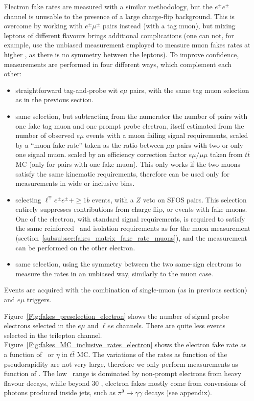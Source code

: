 Electron fake rates are measured with a similar methodology, but the $e^\pm e^\pm$ channel is unusable to the presence of a large charge-flip background. 
This is overcome by working with $e^\pm\mu^\pm$ pairs instead (with a tag muon), but mixing leptons of different flavours brings additional complications 
(one can not, for example, use the unbiased measurement employed to measure muon fakes rates at higher \pt, as there is no symmetry between the leptons). 
To improve confidence, measurements are performed in four different ways, which complement each other: 
\begin{itemize}
\item straightforward tag-and-probe wit $e\mu$ pairs, with the same tag muon selection as in the previous section. 
\item same selection, but subtracting from the numerator the number of pairs with one fake tag muon and one prompt probe electron, 
itself estimated from the number of observed $e\mu$ events with a muon failing signal requirements, 
scaled by a ``muon fake rate'' taken as the ratio between $\mu\mu$ pairs with two or only one signal muon. 
scaled by an efficiency correction factor $e\mu/\mu\mu$ taken from $t\bar t$ MC (only for pairs with one fake muon). 
This only works if the two muons satisfy the same kinematic requirements, therefore can be used only for measurements in wide or inclusive bins. 
\item selecting $\ell^\mp e^\pm e^\pm+\ge 1b$ events, with a $Z$ veto on SFOS pairs. 
This selection entirely suppresses contributions from charge-flip, or events with fake muons. 
One of the electron, with standard signal requirements, is required to satisfy the same reinforced \pt\ and isolation requirements as for the muon measurement 
(section~\ref{subsubsec:fakes_matrix_fake_rate_muons}), 
and the measurement can be performed on the other electron. 
\item same selection, using the symmetry between the two same-sign electrons to measure the rates in an unbiased way, similarly to the muon case. 
\end{itemize}
Events are acquired with the combination of single-muon (as in previous section) and $e\mu$ triggers. 


Figure~\ref{Fig:fakes_preselection_electron} shows the number of signal probe electrons selected in the $e\mu$ and $\ell ee$ channels. 
There are quite less events selected in the trilepton channel. 
Figure~\ref{Fig:fakes_MC_inclusive_rates_electron} shows the electron fake rate as a function of \pt\ or $\eta$ in $t\bar t$ MC. 
The variations of the rates as function of the pseudorapidity are not very large, 
therefore we only perform measurements as function of \pt. 
The low \pt\ range is dominated by non-prompt electrons from heavy flavour decays, while beyond 30 \GeV, 
electron fakes mostly come from conversions of photons produced inside jets, such as $\pi^0\to\gamma\gamma$ decays (see appendix). 

